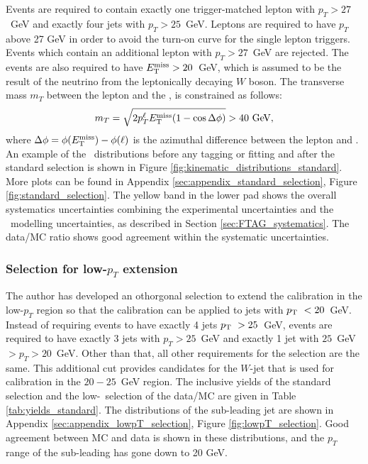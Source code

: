 \documentclass[letterpaper,12pt]{article}
\begin{document}
Events are required to contain exactly one trigger-matched 
lepton with $p_{T} > 27$~GeV and exactly four jets with 
$p_{T} > 25$~GeV. Leptons are required to have $p_{T}$ 
above 27 GeV in order to avoid the turn-on curve for the 
single lepton triggers. Events which contain an additional 
lepton with $p_T > 27$~GeV are rejected. 
The events are also required to have $E_{\mathrm T}^{\mathrm{miss}} > 20$~GeV, which is 
assumed to be the result of the neutrino from the leptonically 
decaying $W$ boson. The transverse
mass $m_T$ between the lepton and the \MET, is
constrained as follows:
\[ m_T = \sqrt{2 p_T^\ell E_{\mathrm T}^{\mathrm{miss}} (1-\cos\Delta\phi)} > 40~\text{Ge\kern -0.1em V},\]
where $\Delta\phi = \phi(E_{\mathrm T}^{\mathrm{miss}})-\phi(\ell)$ is the azimuthal difference between
the lepton and \MET.
An example of the \pt\ distributions before any tagging or fitting and 
after the standard selection is shown in Figure \ref{fig:kinematic_distributions_standard}. 
More plots can be found in Appendix \ref{sec:appendix_standard_selection}, 
Figure \ref{fig:standard_selection}.
The yellow band in the lower pad shows the overall systematics uncertainties combining the 
experimental uncertainties and the \ttbar\ modelling uncertainties, as described in 
Section \ref{sec:FTAG_systematics}. The data/MC ratio shows good agreement 
within the systematic uncertainties. 

\subsubsection{Selection for low-$p_T$ extension}
\label{sec:lowpT_selection}
The author has developed an othorgonal selection to 
extend the calibration in the low-$p_{T}$ region so that the calibration 
can be applied to jets with $p_{\mathrm T}\ < 20$~GeV.
Instead of requiring events to 
have exactly 4 jets $p_{\mathrm T}\ > 25$~GeV, events are required to have exactly 3 jets with $p_{T} > 25$~GeV 
and exactly 1 jet with $25$~GeV $> p_{T} > 20$~GeV. Other than that, 
all other requirements for the selection are the same. 
This additional cut provides candidates for the $W$-jet that is used 
for calibration in the $20-25$~GeV region. 
The inclusive yields of the standard selection and the low-\pt\ selection 
of the data/MC are given in Table \ref{tab:yields_standard}.
The distributions of the sub-leading 
jet are shown in Appendix \ref{sec:appendix_lowpT_selection}, Figure \ref{fig:lowpT_selection}. 
Good agreement between MC and data 
is shown in these distributions, and the $p_{T}$ range of the sub-leading has gone down to 20 GeV. 
\end{document}
